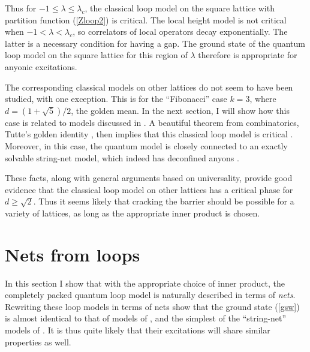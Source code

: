 \documentclass[11pt]{article}
\begin{document}
Thus for $-1\le \lambda \le \lambda_c$, the classical loop model on
the square lattice with partition function (\ref{Zloop2}) is
critical. The local height model is not critical when $-1< \lambda <
\lambda_c$, so correlators of local operators decay exponentially. The
latter is a necessary \cite{Hastings} condition for having a gap. The ground
state of the quantum loop model on the square lattice for this region
of $\lambda$ therefore is
appropriate for anyonic excitations.

The corresponding classical models on other lattices do not seem to
have been studied, with one exception. This is for the ``Fibonacci''
case $k=3$, where $d=(1+\sqrt{5})/2$, the golden mean. In the next
section, I will show how this case is related to models discussed in
\cite{LevinWen,FF,Fidkowski}. A beautiful theorem from combinatorics,
Tutte's golden identity \cite{Tutte}, then implies that this classical
loop model is critical \cite{FF,Fidkowski}. Moreover, in this case,
the quantum model is closely connected to an exactly solvable
string-net model, which indeed has deconfined anyons \cite{LevinWen}.

These facts, along with general arguments based on universality,
provide good evidence that the classical loop model on other lattices
has a critical phase for $d\ge \sqrt{2}$. Thus it seems likely that
cracking the barrier should be possible for a variety of lattices, as
long as the appropriate inner product is chosen.


\section{Nets from loops}
\label{sec:nets}

In this section I show that with the appropriate choice of inner
product, the completely packed quantum loop model is naturally
described in terms of {\em nets}.  Rewriting these
loop models in terms of nets show that the ground state (\ref{gsw}) is
almost identical to that of models of 
\cite{FF}, and the simplest of the ``string-net'' models of
\cite{LevinWen}. It is thus quite likely that their excitations will
share similar properties as well.
\end{document}
